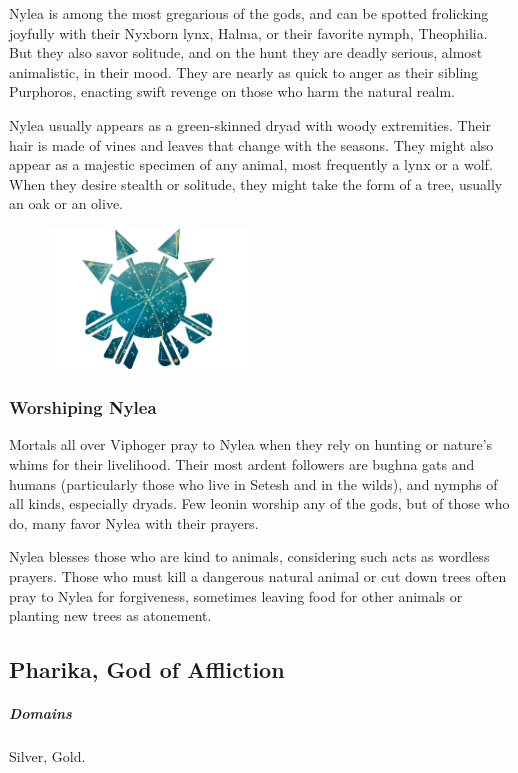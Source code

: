     Nylea is among the most gregarious of the gods, and can be spotted frolicking joyfully with their Nyxborn lynx, Halma, or their favorite nymph, Theophilia.
    But they also savor solitude, and on the hunt they are deadly serious, almost animalistic, in their mood.
    They are nearly as quick to anger as their sibling Purphoros, enacting swift revenge on those who harm the natural realm.

    Nylea usually appears as a green-skinned dryad with woody extremities.
    Their hair is made of vines and leaves that change with the seasons.
    They might also appear as a majestic specimen of any animal, most frequently a lynx or a wolf.
    When they desire stealth or solitude, they might take the form of a tree, usually an oak or an olive.

    \begin{figure}[b]
        \centering
        \includegraphics[width=0.47\textwidth]{02viphoger/img/10s_nylea.png}
    \end{figure}

    \subsubsection{Worshiping Nylea}
        Mortals all over Viphoger pray to Nylea when they rely on hunting or nature's whims for their livelihood.
        Their most ardent followers are bughna gats and humans (particularly those who live in Setesh and in the wilds), and nymphs of all kinds, especially dryads.
        Few leonin worship any of the gods, but of those who do, many favor Nylea with their prayers.

        Nylea blesses those who are kind to animals, considering such acts as wordless prayers.
        Those who must kill a dangerous natural animal or cut down trees often pray to Nylea for forgiveness, sometimes leaving food for other animals or planting new trees as atonement.

\pagebreak

\subsection*{Pharika, God of Affliction} \label{ssec::pharika}
    \subparagraph{Domains} Silver, Gold.

